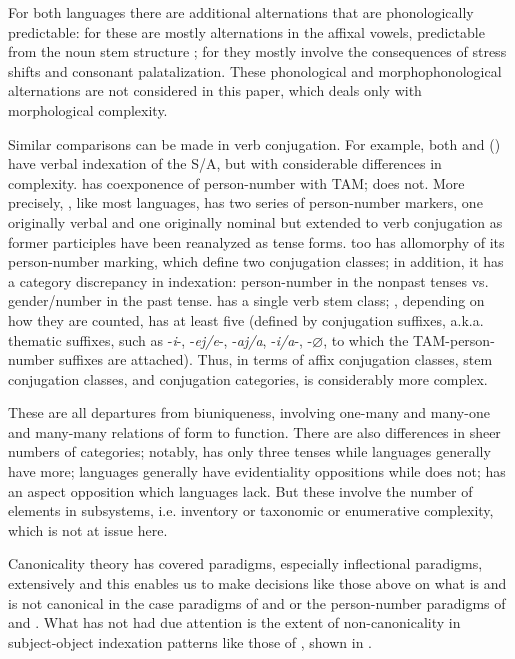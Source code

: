 \documentclass[output=paper,hidelinks]{langscibook}
\begin{document}
For both languages there are additional alternations that are phonologically predictable:  for  these are mostly alternations in the affixal vowels, predictable from the noun stem structure \citep[106--108]{Janhunen2012a}; for  they mostly involve the consequences of stress shifts and consonant palatalization.  These phonological and morphophonological alternations are not considered in this paper, which deals only with morphological complexity. 
 
Similar comparisons can be made in verb conjugation. For example, both  and  () have verbal indexation of the S/A, but with considerable differences in complexity.   has coexponence of person-number with TAM;  does not.  More precisely, , like most  languages, has two series of person-number markers, one originally verbal and one originally nominal but extended to verb conjugation as former participles have been reanalyzed as tense forms.   too has allomorphy of its person-number marking, which define two conjugation classes; in addition, it has a category discrepancy in indexation: person-number in the nonpast tenses vs. gender/number in the past tense.   has a single verb stem class; , depending on how they are counted, has at least five (defined by conjugation suffixes, a.k.a. thematic suffixes, such as -\textit{i}-, -\textit{ej/e}-, -\textit{aj/a}, -\textit{i/a}-, -$\varnothing$, to which the TAM-person-number suffixes are attached).  Thus, in terms of affix conjugation classes, stem conjugation classes, and conjugation categories,  is considerably more complex.   
 
These are all departures from biuniqueness, involving one-many and many-one and many-many relations of form to function.  There are also differences in sheer numbers of categories; notably,  has only three tenses while  languages generally have more;  languages generally have evidentiality oppositions while  does not;  has an aspect opposition which  languages lack.  But these involve the number of elements in subsystems, i.e. inventory or taxonomic or enumerative complexity, which is not at issue here.

Canonicality theory has covered paradigms, especially inflectional paradigms, extensively and this enables us to make decisions like those above on what is and is not canonical in the case paradigms of  and  or the person-number paradigms of  and .  What has not had due attention is the extent of non-canonicality in subject-object indexation patterns like those of , shown in .
\end{document}
